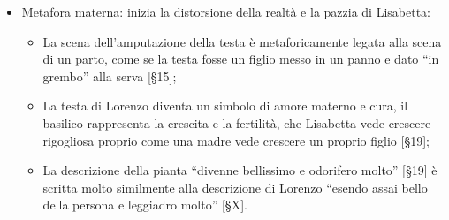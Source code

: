 \documentclass{article}
\begin{document}
\begin{enumerate}
\begin{subenumerate}
\begin{itemize}
                    \item Metafora materna: inizia la distorsione della realtà e la pazzia
                        di Lisabetta:
                        \begin{itemize}
                            \item La scena dell'amputazione della testa è metaforicamente
                                legata alla scena di un parto, come se la testa fosse un
                                figlio messo in un panno e dato ``in grembo'' alla serva
                                [§15];
                            \item La testa di Lorenzo diventa un simbolo di
                                amore materno e cura, il basilico rappresenta la crescita e
                                la fertilità, che Lisabetta vede crescere rigogliosa proprio
                                come una madre vede crescere un proprio figlio [§19];
                            \item La descrizione della pianta ``divenne bellissimo e 
                                odorifero molto'' [§19] è scritta molto similmente alla
                                descrizione di Lorenzo ``esendo assai bello della persona e
                                leggiadro molto'' [§X].
                        \end{itemize}
                \end{itemize}
        \end{subenumerate}
\end{enumerate}

\newpage
\end{document}
